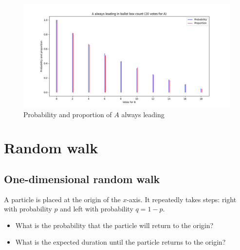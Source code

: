 \documentclass[11pt,a4paper]{article}
\begin{document}
\begin{figure}
\begin{center}
\includegraphics[width=\textwidth]{ballot-01}
\caption{Probability and proportion of $A$ always leading}\label{f.ballot-01}
\end{center}
\end{figure}


\section{Random walk}\label{s.walk}

\subsection{One-dimensional random walk}

A particle is placed at the origin of the $x$-axis. It repeatedly takes steps: right with probability $p$ and left with probability $q=1-p$.
\begin{center}
\end{center}
\begin{itemize}
\item What is the probability that the particle will return to the origin?
\item What is the expected duration until the particle returns to the origin?
\end{itemize}
\end{document}
